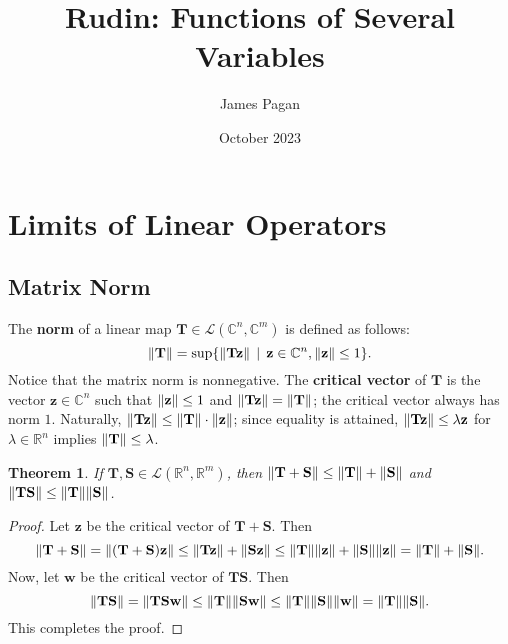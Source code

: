 \documentclass[11pt]{article}
\title{Rudin: Functions of Several Variables}
\author{James Pagan}
\date{October 2023}
\renewcommand{\vec}[1]{\mathbf{#1}}
\newcommand{\mat}[1]{\mathbf{#1}}
\newtheorem{theorem}{Theorem}
\begin{document}
\maketitle
\tableofcontents
\newpage


\section{Limits of Linear Operators}


\subsection{Matrix Norm}

The \textbf{norm} of a linear map $\mat{T} \in \mathcal{L}(\mathbb{C}^{n}, \mathbb{C}^{m})$ is defined as follows:
\[
	\norm{\mat{T}} = \sup \{ \norm{\mat{T} \vec{z}} \, \mid \, \vec{z} \in \mathbb{C}^{n}, \norm{\vec{z}} \le 1\}.
\]
Notice that the matrix norm is nonnegative. The \textbf{critical vector} of $\mat{T}$ is the vector $\vec{z} \in \mathbb{C}^{n}$ such that $\norm{\vec{z}} \le 1$ and $\norm{\mat{T} \vec{z}} = \norm{\mat{T}}$; the critical vector always has norm $1$. Naturally, $\norm{\mat{T} \vec{z}} \le \norm{\mat{T}} \cdot \norm{\vec{z}}$; since equality is attained, $\norm{\mat{T} \vec{z}} \le \lambda \vec{z}$ for $\lambda \in \mathbb{R}^{n}$ implies $\norm{\vec{T}} \le \lambda$.

\begin{theorem}
	If $\mat{T}, \mat{S} \in \mathcal{L}(\mathbb{R}^{n}, \mathbb{R}^{m})$, then $\norm{\mat{T} + \mat{S}} \le \norm{\mat{T}} + \norm{\mat{S}}$ and $\norm{\mat{TS}} \le \norm{\mat{T}} \norm{\mat{S}}$.
\end{theorem}
\begin{adjustwidth}{0.5cm}{}
	\begin{proof}
		Let $\vec{z}$ be the critical vector of $\mat{T} + \mat{S}$. Then
		\[
			\norm{\mat{T} + \mat{S}} = \norm{(\mat{T} + \mat{S})\vec{z}} \le \norm{\mat{T} \vec{z}} + \norm{\mat{S} \vec{z}} \le \norm{\mat{T}} \norm{\vec{z}} + \norm{\mat{S}} \norm{\vec{z}} = \norm{\mat{T}} + \norm{\mat{S}}.
		\]
		Now, let $\vec{w}$ be the critical vector of $\mat{TS}$. Then
		\[
			\norm{\mat{TS}} = \norm{\mat{TS} \vec{w}} \le \norm{\mat{T}} \norm{\mat{S} \vec{w}} \le \norm{\mat{T}} \norm{\mat{S}} \norm{\vec{w}} = \norm{\mat{T}} \norm{\mat{S}}.
		\]
		This completes the proof.
	\end{proof}
\end{adjustwidth}
\end{document}
